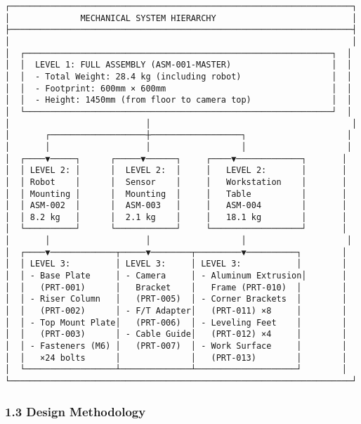 \documentclass[
]{article}
\begin{document}
\begin{verbatim}
┌────────────────────────────────────────────────────────────────────┐
│              MECHANICAL SYSTEM HIERARCHY                           │
├────────────────────────────────────────────────────────────────────┤
│                                                                    │
│  ┌─────────────────────────────────────────────────────────────┐  │
│  │  LEVEL 1: FULL ASSEMBLY (ASM-001-MASTER)                    │  │
│  │  - Total Weight: 28.4 kg (including robot)                  │  │
│  │  - Footprint: 600mm × 600mm                                 │  │
│  │  - Height: 1450mm (from floor to camera top)                │  │
│  └─────────────────────────────────────────────────────────────┘  │
│                           │                                        │
│       ┌───────────────────┼──────────────────┐                    │
│       │                   │                  │                    │
│  ┌────▼─────┐      ┌─────▼──────┐     ┌────▼─────────────┐       │
│  │ LEVEL 2: │      │  LEVEL 2:  │     │   LEVEL 2:       │       │
│  │ Robot    │      │  Sensor    │     │   Workstation    │       │
│  │ Mounting │      │  Mounting  │     │   Table          │       │
│  │ ASM-002  │      │  ASM-003   │     │   ASM-004        │       │
│  │ 8.2 kg   │      │  2.1 kg    │     │   18.1 kg        │       │
│  └──────────┘      └────────────┘     └──────────────────┘       │
│       │                   │                  │                    │
│  ┌────▼─────────────┬─────▼────────┬─────────▼──────────┐        │
│  │ LEVEL 3:         │ LEVEL 3:     │ LEVEL 3:           │        │
│  │ - Base Plate     │ - Camera     │ - Aluminum Extrusion│       │
│  │   (PRT-001)      │   Bracket    │   Frame (PRT-010)  │        │
│  │ - Riser Column   │   (PRT-005)  │ - Corner Brackets  │        │
│  │   (PRT-002)      │ - F/T Adapter│   (PRT-011) ×8     │        │
│  │ - Top Mount Plate│   (PRT-006)  │ - Leveling Feet    │        │
│  │   (PRT-003)      │ - Cable Guide│   (PRT-012) ×4     │        │
│  │ - Fasteners (M6) │   (PRT-007)  │ - Work Surface     │        │
│  │   ×24 bolts      │              │   (PRT-013)        │        │
│  └──────────────────┴──────────────┴────────────────────┘        │
└────────────────────────────────────────────────────────────────────┘
\end{verbatim}

\hypertarget{design-methodology}{%
\subsubsection{1.3 Design Methodology}\label{design-methodology}}
\end{document}
